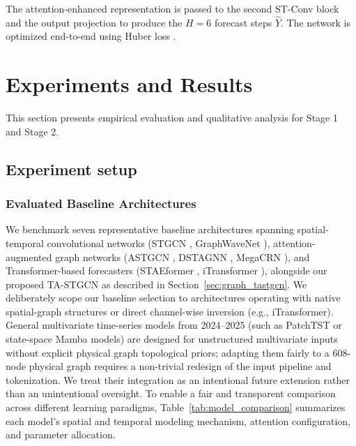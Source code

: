 \documentclass[preprint,12pt]{elsarticle}
\begin{document}
The attention-enhanced representation is passed to the second ST-Conv block and the output projection to produce the $H=6$ forecast steps $\hat{Y}$. The network is optimized end-to-end using Huber loss \citep{huber}.
\section{Experiments and Results}
\label{sec:results}

This section presents empirical evaluation and qualitative analysis for Stage 1  and Stage 2.
\subsection{Experiment setup}
\label{sec:experiments}

\subsubsection{Evaluated Baseline Architectures}
\label{sec:baselines_config}
We benchmark seven representative baseline architectures spanning spatial-temporal convolutional networks (STGCN \citep{stgcn}, GraphWaveNet \citep{wavenet}), attention-augmented graph networks (ASTGCN \citep{astgcn}, DSTAGNN \citep{dstagnn}, MegaCRN \citep{megacrn}), and Transformer-based forecasters (STAEformer \citep{staeformer}, iTransformer \citep{itransformer}), alongside our proposed TA-STGCN as described in Section~\ref{sec:graph_tastgcn}. We deliberately scope our baseline selection to architectures operating with native spatial-graph structures or direct channel-wise inversion (e.g., iTransformer). General multivariate time-series models from 2024--2025 (such as PatchTST \citep{patchtst} or state-space Mamba \citep{mamba} models) are designed for unstructured multivariate inputs without explicit physical graph topological priors; adapting them fairly to a 608-node physical graph requires a non-trivial redesign of the input pipeline and tokenization. We treat their integration as an intentional future extension rather than an unintentional oversight. To enable a fair and transparent comparison across different learning paradigms, Table~\ref{tab:model_comparison} summarizes each model's spatial and temporal modeling mechanism, attention configuration, and parameter allocation.
\end{document}
